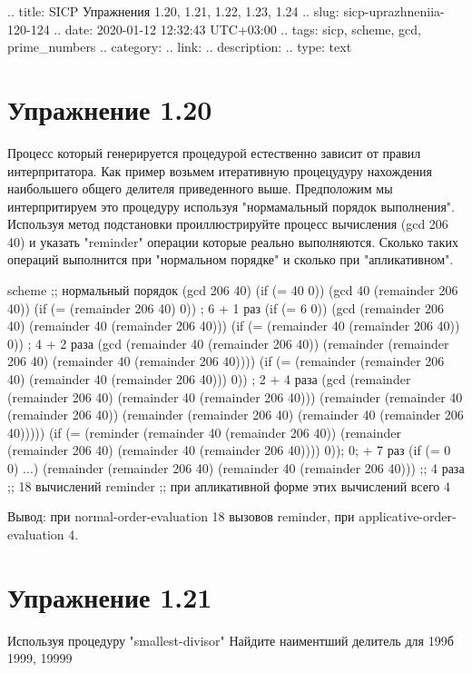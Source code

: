 .. title: SICP Упражнения 1.20, 1.21, 1.22, 1.23, 1.24
.. slug: sicp-uprazhneniia-120-124
.. date: 2020-01-12 12:32:43 UTC+03:00
.. tags: sicp, scheme, gcd, prime_numbers
.. category: 
.. link: 
.. description: 
.. type: text



\chapter{Упражнение 1.20}

Процесс который генерируется процедурой естественно зависит от правил интерпритатора. Как пример возьмем итеративную процецудуру нахождения наибольшего общего делителя приведенного выше. Предположим мы интерпритируем это процедуру используя "нормамальный порядок выполнения". Используя метод подстановки проиллюстрируйте процесс вычисления (gcd 206 40) и указать "reminder" операции которые реально выполняются. Сколько таких операций выполнится при "нормальном порядке" и сколько при "апликативном".

\begin{codelisting}{scheme}
;; нормальный порядок
(gcd 206 40)
(if (= 40 0))
(gcd 40 (remainder 206 40))
(if (= (remainder 206 40) 0)) ; 6 + 1 раз
(if (= 6 0))
(gcd (remainder 206 40) (remainder 40 (remainder 206 40)))
(if (= (remainder 40 (remainder 206 40)) 0)) ; 4 + 2 раза
(gcd (remainder 40 (remainder 206 40)) (remainder (remainder 206 40) (remainder 40 (remainder 206 40))))
(if (= (remainder (remainder 206 40) (remainder 40 (remainder 206 40))) 0)) ; 2 + 4 раза
(gcd (remainder (remainder 206 40) (remainder 40 (remainder 206 40))) (remainder (remainder 40 (remainder 206 40)) (remainder (remainder 206 40) (remainder 40 (remainder 206 40)))))
(if (= (reminder (remainder 40 (remainder 206 40)) (remainder (remainder 206 40) (remainder 40 (remainder 206 40)))) 0)); 0; + 7 раз
(if (= 0 0) ...)
(remainder (remainder 206 40) (remainder 40 (remainder 206 40))) ;; 4 раза
;; 18 вычислений reminder
;; при апликативной форме этих вычислений всего 4
\end{codelisting}

Вывод: при normal-order-evaluation 18 вызовов reminder, при applicative-order-evaluation 4.

\chapter{Упражнение 1.21}

Используя процедуру "smallest-divisor" Найдите наиментший делитель для 199б 1999, 19999

